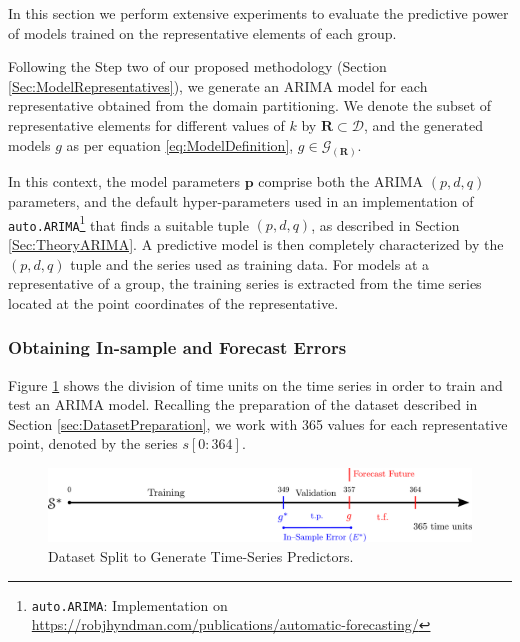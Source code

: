 In this section we perform extensive experiments to evaluate the predictive power of models trained on the representative elements of each group. 

Following the Step two of our proposed methodology (Section \ref{Sec:ModelRepresentatives}), we generate an ARIMA model for each representative obtained from the domain partitioning. We denote the subset of representative elements for different values of $k$ by $\mathbf{R} \subset \mathcal{D}$, and the generated models $g$ as per equation \ref{eq:ModelDefinition}, $g \in \mathcal{G}_{(\mathbf{R})}$. 

In this context, the model parameters $\mathbf{p}$ comprise both the ARIMA $(p, d, q)$ parameters, and the default hyper-parameters used in an implementation of \texttt{auto.ARIMA}\footnote{\texttt{auto.ARIMA}: Implementation on \url{https://robjhyndman.com/publications/automatic-forecasting/}} that finds a suitable tuple $(p, d, q)$, as described in Section \ref{Sec:TheoryARIMA}. A predictive model is then completely characterized by the $(p, d, q)$ tuple and the series used as training data. For models at a representative of a group, the training series is extracted from the time series located at the point coordinates of the representative.

\subsubsection{Obtaining In-sample and Forecast Errors}
\label{sec:InSampleForecastErrors}

Figure \ref{Fig:Time-SeriesModel} shows the division of time units on the time series in order to train and test an ARIMA model. Recalling the preparation of the dataset described in Section \ref{sec:DatasetPreparation}, we work with 365 values for each representative point, denoted by the series $s[0:364]$.

\begin{figure}[h]
	\centering
	\includegraphics[scale=0.35]{../Figures/ModelRegion_ModelTS}
	\caption{Dataset Split to Generate Time-Series Predictors.}
	\label{Fig:Time-SeriesModel}
\end{figure}

